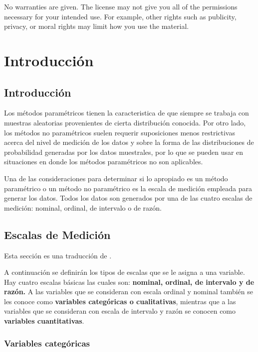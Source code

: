 \documentclass[
  a4paper,
  oneside,
  openany]{book}
\begin{document}
No warranties are given. The license may not give you all of the
permissions necessary for your intended use. For example, other rights
such as publicity, privacy, or moral rights may limit how you use the
material.

\hypertarget{part-introducciuxf3n}{%
\part{Introducción}\label{part-introducciuxf3n}}

\hypertarget{introducciuxf3n}{%
\chapter*{Introducción}\label{introducciuxf3n}}


Los métodos paramétricos tienen la caracteristica de que siempre se trabaja con muestras aleatorias provenientes de cierta distribución conocida. Por otro lado, los métodos no paramétricos suelen requerir suposiciones menos restrictivas acerca del nivel de medición de los datos y sobre la forma de las distribuciones de probabilidad generadas por los datos muestrales, por lo que se pueden usar en situaciones en donde los métodos paramétricos no son aplicables.

Una de las consideraciones para determinar si lo apropiado es un método paramétrico o un método no paramétrico es la escala de medición empleada para generar los datos. Todos los datos son generados por una de las cuatro escalas de medición: nominal, ordinal, de intervalo o de razón.

\hypertarget{escalas-de-mediciuxf3n}{%
\chapter{Escalas de Medición}\label{escalas-de-mediciuxf3n}}

Esta sección es una traducción de \citet{conover1998practical}.

A continuación se definirán los tipos de escalas que se le asigna a una variable. Hay cuatro escalas básicas las cuales son: \textbf{nominal, ordinal, de intervalo y de razón.} A las variables que se consideran con escala ordinal y nominal también se les conoce como \textbf{variables categóricas o cualitativas}, mientras que a las variables que se consideran con escala de intervalo y razón se conocen como \textbf{variables cuantitativas}.

\hypertarget{variables-categuxf3ricas}{%
\section{Variables categóricas}\label{variables-categuxf3ricas}}
\end{document}
